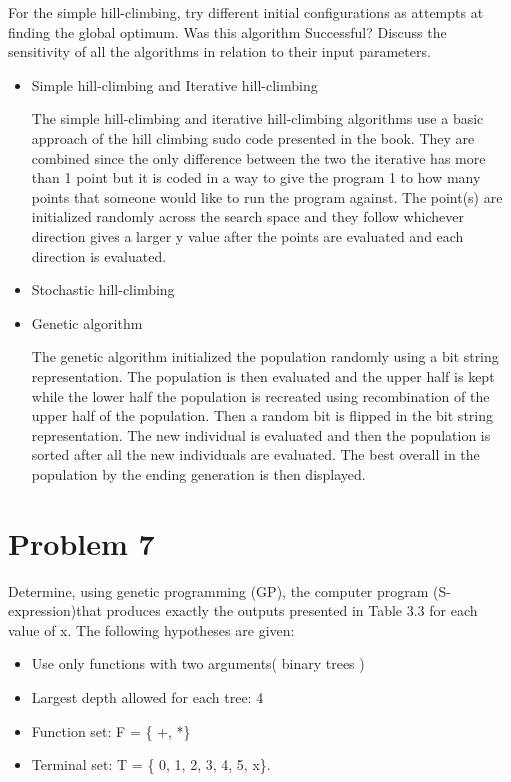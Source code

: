 {\setlength{\parindent}{0cm}For the simple hill-climbing, try different initial configurations as attempts at finding the global optimum. Was this algorithm Successful?
Discuss the sensitivity of all the algorithms in relation to their input parameters.}
\begin{itemize}
	\item Simple hill-climbing and Iterative hill-climbing
	\par
	The simple hill-climbing and iterative hill-climbing algorithms use a basic approach of the hill climbing sudo code presented in the book. They are combined since the only difference between the two the iterative has more than 1 point but it is coded in a way to give the program 1 to how many points that someone would like to run the program against. The point(s) are initialized randomly across the search space and they follow whichever direction gives a larger y value after the points are evaluated and each direction is evaluated. 
	\item Stochastic hill-climbing
	\item Genetic algorithm
	\par
	The genetic algorithm initialized the population randomly using a bit string representation. The population is then evaluated and the upper half is kept while the lower half the population is recreated using recombination of the upper half of the population. Then a random bit is flipped in the bit string representation. The new individual is evaluated and then the population is sorted after all the new individuals are evaluated. The best overall in the population by the ending generation is then displayed.
\end{itemize}
\section{Problem 7}
Determine, using genetic programming (GP), the computer program (S-expression)that produces exactly the outputs presented in Table 3.3 for each value of x. The following hypotheses are given:
\begin{itemize}
	\item Use only functions with two arguments( binary trees )
	\item Largest depth allowed for each tree: 4
	\item Function set: F = \{ +, *\}
	\item Terminal set: T = \{ 0, 1, 2, 3, 4, 5, x\}.
\end{itemize}

